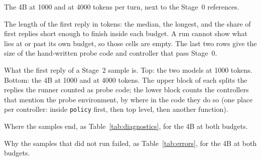 \documentclass[11pt,a4paper]{article}
\begin{document}
\begin{table}[h]
\centering\small
\resizebox{\linewidth}{!}{}
\caption{The 4B at 1000 and at 4000 tokens per turn, next to the Stage~0
references.}
\label{tab:budget-comparison}
\end{table}

\begin{table}[h]
\centering\small
\resizebox{\linewidth}{!}{}
\caption{The length of the first reply in tokens: the median, the longest,
and the share of first replies short enough to finish inside each budget. A
run cannot show what lies at or past its own budget, so those cells are
empty. The last two rows give the size of the hand-written probe code and
controller that pass Stage~0.}
\label{tab:reply-tokens}
\end{table}

\begin{table}[h]
\centering\small


\medskip

\caption{What the first reply of a Stage~2 sample is. Top: the two models at
1000 tokens. Bottom: the 4B at 1000 and at 4000 tokens. The upper block of
each splits the replies the runner counted as probe code; the lower block
counts the controllers that mention the probe environment, by where in the
code they do so (one place per controller: inside \texttt{policy} first, then
top level, then another function).}
\label{tab:first-replies}
\end{table}

\begin{table}[h]
\centering\small
\resizebox{\linewidth}{!}{}
\caption{Where the samples end, as Table~\ref{tab:diagnostics}, for the 4B at
both budgets.}
\label{tab:budget-diagnostics}
\end{table}

\begin{table}[h]
\centering\small
\resizebox{\linewidth}{!}{}
\caption{Why the samples that did not run failed, as Table~\ref{tab:errors},
for the 4B at both budgets.}
\label{tab:budget-errors}
\end{table}
\end{document}
